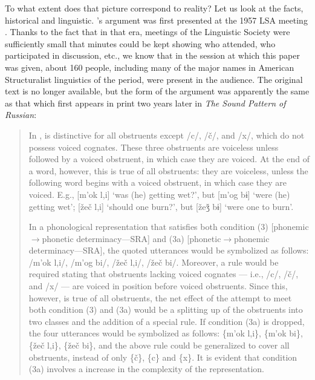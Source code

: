 To what extent does that picture correspond to reality? Let us look at
the facts, historical and linguistic. {\Halle}'s argument was first
presented at the 1957 LSA meeting \citep{halle:1957lsa}. Thanks to
the fact that in that era, meetings of the Linguistic Society were
sufficiently small that minutes could be kept showing who attended,
who participated in discussion, etc., we know that in the session at
which this paper was given, about 160 people, including many of the
major names in American Structuralist linguistics of the period, were
present in the audience. The original text is no longer available, but
the form of the argument was apparently the same as that which first
appears in print two years later in \textsl{The Sound Pattern of
  Russian}:
\begin{quotation}
  In ,  is distinctive for all obstruents except /c/,
  /č/, and /x/, which do not possess voiced cognates. These three
  obstruents are voiceless unless followed by a voiced obstruent, in
  which case they are voiced. At the end of a word, however, this is
  true of all  obstruents: they are voiceless, unless the
  following word begins with a voiced obstruent, in which case they
  are voiced. E.g., {[m'ok l,i]} `was (he) getting wet?', but {[m'og
    bɨ]} `were (he) getting wet'; {[žeč l,i]} `should
  one burn?', but {[žeǯ bɨ]} `were one to
  burn'.
    
  In a phonological representation that satisfies both condition (3)
  {[pho\-ne\-mic$\rightarrow$phonetic determinacy---SRA]} and (3a)
  {[phonetic$\rightarrow$phonemic de\-ter\-minacy---SRA]}, the quoted
  utterances would be symbolized as follows:\\/m'ok l,i/, /m'og bi/,
  /žeč l,i/, /žeč bi/. Moreover, a rule would be required stating that
  obstruents lacking voiced cognates --- i.e., /c/, /č/, and /x/ ---
  are voiced in position before voiced obstruents. Since this,
  however, is true of all obstruents, the net effect of the attempt to
  meet both condition (3) and (3a) would be a splitting up of the
  obstruents into two classes and the addition of a special rule. If
  condition (3a) is dropped, the four utterances would be symbolized
  as follows: \{m'ok l,i\}, \{m'ok bi\}, \{žeč l,i\}, \{žeč bi\}, and
  the above rule could be generalized to cover all obstruents, instead
  of only \{č\}, \{c\} and \{x\}. It is evident that condition (3a)
  involves a
   increase in the complexity of the representation.\\
  \citep[22f]{halle:spr}
\end{quotation}
  
